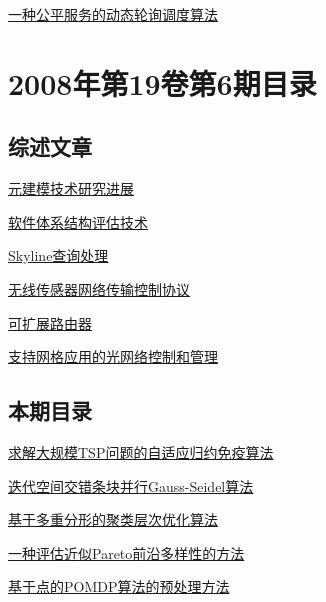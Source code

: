 \documentclass[a4paper]{article}
\begin{document}
\href{http://www.jos.org.cn/ch/reader/download_pdf.aspx?file_no=20080728&year_id=2008&quarter_id=7&falg=1}{一种公平服务的动态轮询调度算法}


\section{\textbf{2008年第19卷第6期目录}}
\subsection{综述文章}
\href{http://www.jos.org.cn/ch/reader/download_pdf.aspx?file_no=20080606&year_id=2008&quarter_id=6&falg=1}{元建模技术研究进展}

\href{http://www.jos.org.cn/ch/reader/download_pdf.aspx?file_no=20080607&year_id=2008&quarter_id=6&falg=1}{软件体系结构评估技术}

\href{http://www.jos.org.cn/ch/reader/download_pdf.aspx?file_no=20080612&year_id=2008&quarter_id=6&falg=1}{Skyline查询处理}

\href{http://www.jos.org.cn/ch/reader/download_pdf.aspx?file_no=20080617&year_id=2008&quarter_id=6&falg=1}{无线传感器网络传输控制协议}

\href{http://www.jos.org.cn/ch/reader/download_pdf.aspx?file_no=20080618&year_id=2008&quarter_id=6&falg=1}{可扩展路由器}

\href{http://www.jos.org.cn/ch/reader/download_pdf.aspx?file_no=20080621&year_id=2008&quarter_id=6&falg=1}{支持网格应用的光网络控制和管理}

\subsection{本期目录}
\href{http://www.jos.org.cn/ch/reader/download_pdf.aspx?file_no=20080601&year_id=2008&quarter_id=6&falg=1}{求解大规模TSP问题的自适应归约免疫算法}

\href{http://www.jos.org.cn/ch/reader/download_pdf.aspx?file_no=20080602&year_id=2008&quarter_id=6&falg=1}{迭代空间交错条块并行Gauss-Seidel算法}

\href{http://www.jos.org.cn/ch/reader/download_pdf.aspx?file_no=20080603&year_id=2008&quarter_id=6&falg=1}{基于多重分形的聚类层次优化算法}

\href{http://www.jos.org.cn/ch/reader/download_pdf.aspx?file_no=20080604&year_id=2008&quarter_id=6&falg=1}{一种评估近似Pareto前沿多样性的方法}

\href{http://www.jos.org.cn/ch/reader/download_pdf.aspx?file_no=20080605&year_id=2008&quarter_id=6&falg=1}{基于点的POMDP算法的预处理方法}
\end{document}
